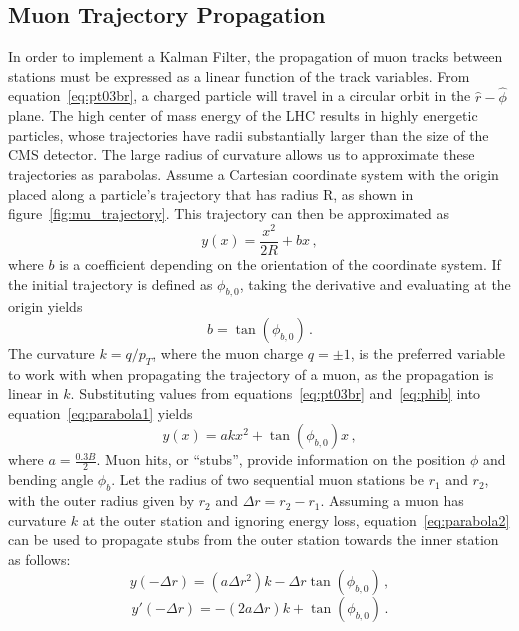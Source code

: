 \subsection{Muon Trajectory Propagation} \label{sec:muons_prop}
In order to implement a Kalman Filter, the propagation of muon tracks between stations must be expressed as a linear function of the track variables. From equation~\ref{eq:pt03br}, a charged particle will travel in a circular orbit in the $\hat{r}-\hat{\phi}$ plane. The high center of mass energy of the LHC results in highly energetic particles, whose trajectories have radii substantially larger than the size of the CMS detector. The large radius of curvature allows us to approximate these trajectories as parabolas. Assume a Cartesian coordinate system with the origin placed along a particle's trajectory that has radius R, as shown in figure~\ref{fig:mu_trajectory}. This trajectory can then be approximated as
\begin{equation}
	\label{eq:parabola1}
	y(x)=\frac{x^2}{2R}+bx\,,
\end{equation}
where $b$ is a coefficient depending on the orientation of the coordinate system. If the initial trajectory is defined as $\phi_{b,0}$, taking the derivative and evaluating at the origin yields
\begin{equation}
	\label{eq:phib}
	b=\tan(\phi_{b,0})\,.
\end{equation}	
The curvature $k=q/p_{T}$, where the muon charge $q=\pm1$, is the preferred variable to work with when propagating the trajectory of a muon, as the propagation is linear in $k$. Substituting values from equations~\ref{eq:pt03br} and~\ref{eq:phib} into equation~\ref{eq:parabola1} yields
\begin{equation}
	\label{eq:parabola2}
	y(x)=akx^2+\tan(\phi_{b,0})x\,,
\end{equation}
where $a=\frac{0.3B}{2}$. Muon hits, or ``stubs'', provide information on the position $\phi$ and bending angle $\phi_b$. Let the radius of two sequential muon stations be $r_1$ and $r_2$, with the outer radius given by $r_2$ and $\Delta r=r_2-r_1$. Assuming a muon has curvature $k$ at the outer station and ignoring energy loss, equation~\ref{eq:parabola2} can be used to propagate stubs from the outer station towards the inner station as follows:
\begin{equation}
	y(-\Delta r) = \left(a\Delta r^2\right)k-\Delta r\tan(\phi_{b,0})\,,
\end{equation}
\begin{equation}
	y'(-\Delta r)=-\left(2a\Delta r\right)k+\tan(\phi_{b,0})\,.
\end{equation}
